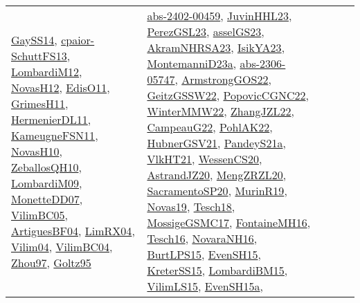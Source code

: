 {\begin{longtable}{llp{6cm}p{6cm}p{6cm}}
\href{papers/GaySS14.pdf}{GaySS14}\cite{GaySS14}, \href{papers/cpaior-SchuttFS13.pdf}{cpaior-SchuttFS13}\cite{cpaior-SchuttFS13}, \href{articles/LombardiM12.pdf}{LombardiM12}\cite{LombardiM12}, \href{articles/NovasH12.pdf}{NovasH12}\cite{NovasH12}, \href{papers/EdisO11.pdf}{EdisO11}\cite{EdisO11}, \href{papers/GrimesH11.pdf}{GrimesH11}\cite{GrimesH11}, \href{papers/HermenierDL11.pdf}{HermenierDL11}\cite{HermenierDL11}, \href{papers/KameugneFSN11.pdf}{KameugneFSN11}\cite{KameugneFSN11}, \href{articles/NovasH10.pdf}{NovasH10}\cite{NovasH10}, \href{articles/ZeballosQH10.pdf}{ZeballosQH10}\cite{ZeballosQH10}, \href{papers/LombardiM09.pdf}{LombardiM09}\cite{LombardiM09}, \href{papers/MonetteDD07.pdf}{MonetteDD07}\cite{MonetteDD07}, \href{articles/VilimBC05.pdf}{VilimBC05}\cite{VilimBC05}, \href{papers/ArtiguesBF04.pdf}{ArtiguesBF04}\cite{ArtiguesBF04}, \href{papers/LimRX04.pdf}{LimRX04}\cite{LimRX04}, \href{papers/Vilim04.pdf}{Vilim04}\cite{Vilim04}, \href{papers/VilimBC04.pdf}{VilimBC04}\cite{VilimBC04}, \href{articles/Zhou97.pdf}{Zhou97}\cite{Zhou97}, \href{papers/Goltz95.pdf}{Goltz95}\cite{Goltz95} & \href{articles/abs-2402-00459.pdf}{abs-2402-00459}\cite{abs-2402-00459}, \href{papers/JuvinHHL23.pdf}{JuvinHHL23}\cite{JuvinHHL23}, \href{papers/PerezGSL23.pdf}{PerezGSL23}\cite{PerezGSL23}, \href{papers/asselGS23.pdf}{asselGS23}\cite{asselGS23}, \href{articles/AkramNHRSA23.pdf}{AkramNHRSA23}\cite{AkramNHRSA23}, \href{articles/IsikYA23.pdf}{IsikYA23}\cite{IsikYA23}, \href{articles/MontemanniD23a.pdf}{MontemanniD23a}\cite{MontemanniD23a}, \href{articles/abs-2306-05747.pdf}{abs-2306-05747}\cite{abs-2306-05747}, \href{papers/ArmstrongGOS22.pdf}{ArmstrongGOS22}\cite{ArmstrongGOS22}, \href{papers/GeitzGSSW22.pdf}{GeitzGSSW22}\cite{GeitzGSSW22}, \href{papers/PopovicCGNC22.pdf}{PopovicCGNC22}\cite{PopovicCGNC22}, \href{papers/WinterMMW22.pdf}{WinterMMW22}\cite{WinterMMW22}, \href{papers/ZhangJZL22.pdf}{ZhangJZL22}\cite{ZhangJZL22}, \href{articles/CampeauG22.pdf}{CampeauG22}\cite{CampeauG22}, \href{articles/PohlAK22.pdf}{PohlAK22}\cite{PohlAK22}, \href{articles/HubnerGSV21.pdf}{HubnerGSV21}\cite{HubnerGSV21}, \href{articles/PandeyS21a.pdf}{PandeyS21a}\cite{PandeyS21a}, \href{articles/VlkHT21.pdf}{VlkHT21}\cite{VlkHT21}, \href{papers/WessenCS20.pdf}{WessenCS20}\cite{WessenCS20}, \href{articles/AstrandJZ20.pdf}{AstrandJZ20}\cite{AstrandJZ20}, \href{articles/MengZRZL20.pdf}{MengZRZL20}\cite{MengZRZL20}, \href{articles/SacramentoSP20.pdf}{SacramentoSP20}\cite{SacramentoSP20}, \href{papers/MurinR19.pdf}{MurinR19}\cite{MurinR19}, \href{articles/Novas19.pdf}{Novas19}\cite{Novas19}, \href{papers/Tesch18.pdf}{Tesch18}\cite{Tesch18}, \href{papers/MossigeGSMC17.pdf}{MossigeGSMC17}\cite{MossigeGSMC17}, \href{papers/FontaineMH16.pdf}{FontaineMH16}\cite{FontaineMH16}, \href{papers/Tesch16.pdf}{Tesch16}\cite{Tesch16}, \href{articles/NovaraNH16.pdf}{NovaraNH16}\cite{NovaraNH16}, \href{papers/BurtLPS15.pdf}{BurtLPS15}\cite{BurtLPS15}, \href{papers/EvenSH15.pdf}{EvenSH15}\cite{EvenSH15}, \href{papers/KreterSS15.pdf}{KreterSS15}\cite{KreterSS15}, \href{papers/LombardiBM15.pdf}{LombardiBM15}\cite{LombardiBM15}, \href{papers/VilimLS15.pdf}{VilimLS15}\cite{VilimLS15}, \href{articles/EvenSH15a.pdf}{EvenSH15a}\cite{EvenSH15a}, 
\end{longtable}}
